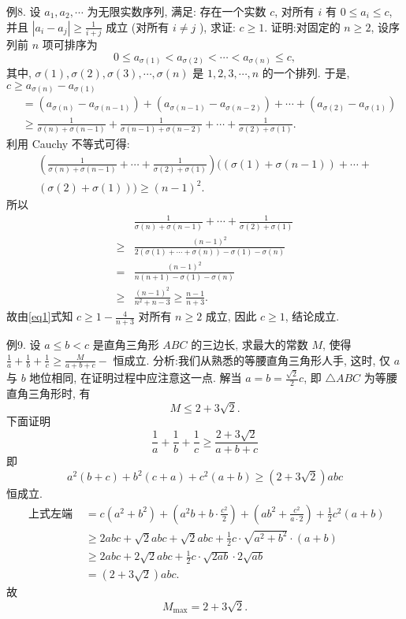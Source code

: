 例8. 设 $a_1, a_2, \cdots$ 为无限实数序列, 满足: 存在一个实数 $c$, 对所有 $i$ 有
$0 \leqslant a_i \leqslant c$, 并且 $\left|a_i-a_j\right| \geqslant \frac{1}{i+j}$ 成立 (对所有 $i \neq j$ ), 求证: $c \geqslant 1$.
证明:对固定的 $n \geqslant 2$, 设序列前 $n$ 项可排序为
$$
0 \leqslant a_{\sigma(1)}<a_{\sigma(2)}<\cdots<a_{\sigma(n)} \leqslant c,
$$
其中, $\sigma(1), \sigma(2), \sigma(3), \cdots, \sigma(n)$ 是 $1,2,3, \cdots, n$ 的一个排列.
于是, $c \geqslant a_{\sigma(n)}-a_{\sigma(1)}$
$$
\begin{aligned}
& =\left(a_{\sigma(n)}-a_{\sigma(n-1)}\right)+\left(a_{\sigma(n-1)}-a_{\sigma(n-2)}\right)+\cdots+\left(a_{\sigma(2)}-a_{\sigma(1)}\right) \\
& \geqslant \frac{1}{\sigma(n)+\sigma(n-1)}+\frac{1}{\sigma(n-1)+\sigma(n-2)}+\cdots+\frac{1}{\sigma(2)+\sigma(1)} .
\end{aligned} \label{eq1}
$$
利用 Cauchy 不等式可得:
$$
\begin{gathered}
\left(\frac{1}{\sigma(n)+\sigma(n-1)}+\cdots+\frac{1}{\sigma(2)+\sigma(1)}\right)((\sigma(1)+\sigma(n-1))+\cdots+ \\
(\sigma(2)+\sigma(1))) \geqslant(n-1)^2 .
\end{gathered}
$$
所以
$$
\begin{aligned}
& \frac{1}{\sigma(n)+\sigma(n-1)}+\cdots+\frac{1}{\sigma(2)+\sigma(1)} \\
\geqslant & \frac{(n-1)^2}{2(\sigma(1)+\cdots+\sigma(n))-\sigma(1)-\sigma(n)} \\
= & \frac{(n-1)^2}{n(n+1)-\sigma(1)-\sigma(n)} \\
\geqslant & \frac{(n-1)^2}{n^2+n-3} \geqslant \frac{n-1}{n+3} .
\end{aligned}
$$
故由\ref{eq1}式知 $c \geqslant 1-\frac{4}{n+3}$ 对所有 $n \geqslant 2$ 成立, 因此 $c \geqslant 1$, 结论成立.



例9. 设 $a \leqslant b<c$ 是直角三角形 $A B C$ 的三边长, 求最大的常数 $M$, 使得 $\frac{1}{a}+\frac{1}{b}+\frac{1}{c} \geqslant \frac{M}{a+b+c}-$ 恒成立.
分析:我们从熟悉的等腰直角三角形人手, 这时, 仅 $a$ 与 $b$ 地位相同, 在证明过程中应注意这一点.
解当 $a=b=\frac{\sqrt{2}}{2} c$, 即 $\triangle A B C$ 为等腰直角三角形时, 有
$$
M \leqslant 2+3 \sqrt{2} .
$$
下面证明
$$
\frac{1}{a}+\frac{1}{b}+\frac{1}{c} \geqslant \frac{2+3 \sqrt{2}}{a+b+c}
$$
即
$$
a^2(b+c)+b^2(c+a)+c^2(a+b) \geqslant(2+3 \sqrt{2}) a b c
$$
恒成立.
$$
\begin{aligned}
\text { 上式左端 } & =c\left(a^2+b^2\right)+\left(a^2 b+b \cdot \frac{c^2}{2}\right)+\left(a b^2+\frac{c^2}{a \cdot 2}\right)+\frac{1}{2} c^2(a+b) \\
& \geqslant 2 a b c+\sqrt{2} a b c+\sqrt{2} a b c+\frac{1}{2} c \cdot \sqrt{a^2+b^2} \cdot(a+b) \\
& \geqslant 2 a b c+2 \sqrt{2} a b c+\frac{1}{2} c \cdot \sqrt{2 a b} \cdot 2 \sqrt{a b} \\
& =(2+3 \sqrt{2}) a b c .
\end{aligned}
$$
故
$$
M_{\max }=2+3 \sqrt{2} .
$$



